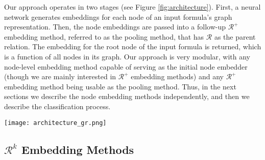 \documentclass{article}
\begin{document}
Our approach operates in two stages (see Figure \ref{fig:architecture}). First, a neural network generates embeddings for each node of an input formula's graph representation. Then, the node embeddings are passed into a follow-up $\mathcal{R}^+$ embedding method, referred to as the pooling method, that has $\mathcal{R}$ as the parent relation. The embedding for the root node of the input formula is returned, which is a function of all nodes in its graph. Our approach is very modular, with any node-level embedding method capable of serving as the initial node embedder (though we are mainly interested in $\mathcal{R}^+$ embedding methods) and any $\mathcal{R}^+$ embedding method being usable as the pooling method. Thus, in the next sections we describe the node embedding methods independently, and then we describe the classification process.


\begin{figure*}
\centering
\texttt{[image: architecture\_gr.png]}
\caption{A depiction of the overall embedding process with an MPNN as the initial node embedder and DAG LSTM as the pooling method. In both boxes, arrows indicate flow of information. }
\label{fig:architecture}
\vspace{-0.1in}
\end{figure*}



\subsection{$\mathcal{R}^{k}$ Embedding Methods}
\label{sec:local_embedders}
\end{document}
